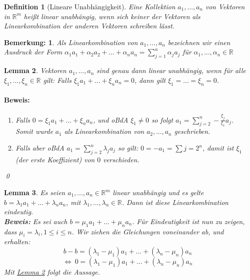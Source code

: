 \documentclass{report}
\newcommand{\IN}[1]{\index{#1|BH}}
\newcommand{\lb}{\lambda}
\newcommand{\R}{\mathbb{R}}
\newcommand{\al}{\alpha}
\theoremstyle{customrem}
\newtheorem*{bemerkung}{Bemerkung\textnormal:}
\theoremstyle{customdef}
\newtheorem{definition}{Definition}[chapter]
\newtheorem{lemma}[definition]{Lemma}
\renewenvironment{proof}{\paragraph{Beweis: }}{\qed}
\begin{document}
	\vspace{.2cm}
	\begin{definition}[Lineare Unabhängigkeit]
		\IN{Lineare Unabhängigkeit}
		\label{deflineareunab}
		Eine Kollektion $a_1, \dots, a_n$ von Vektoren in $\R^m$ heißt linear unabhängig, wenn sich keiner der Vektoren als Linearkombination der anderen Vektoren schreiben lässt.
	\end{definition}
	
	\begin{bemerkung}
		Als Linearkombination von $a_1, \dots, a_n$ bezeichnen  wir einen Ausdruck der Form $\al_1a_1 + \al_2 a_2 + \ldots + \al_n a_n = \sum_{j=1}^n \al_j a_j$ für $\al_1, \dots, \al_n \in \R$
	\end{bemerkung}
	
	\begin{lemma}
		\label{lem10}
		Vektoren $a_1, \dots, a_n$ sind genau dann linear unabhängig, wenn für alle $\xi_1, \dots, \xi_n \in\R$ gilt: Falls $\xi_1a_1 + \dots + \xi_na_n = 0$, dann gilt $\xi_1 = \dots = \xi_n = 0$.\\
		\begin{proof}
			\begin{enumerate}
				\itemsep-.125cm
				\item Falls $0 = \xi_1 a_1 + \dots + \xi_n a_n$, und oBdA $\xi_1 \neq 0$ so folgt $a_1 = \sum_{j=2}^n -\frac{\xi_j}{\xi_1} a_j$. Somit wurde $a_1$ als Linearkombination von $a_2, \dots, a_n$ geschrieben.
				\item Falls aber oBdA $a_1 = \sum_{j=2}^n \lb_j a_j$ so gilt: $0 = -a_1 = \sum{j=2}^n$, damit ist $\xi_1$ (der erste Koeffizient) von $0$ verschieden.
			\end{enumerate}
		\end{proof}
	\end{lemma}
	
	\begin{lemma}
		\label{lem11}
		Es seien $a_1, \dots, a_n \in \R^m$  linear unabhängig und es gelte $b = \lb_1a_1 + \dots + \lb_n a_n$, mit $\lb_1, \dots, \lb_n \in \R$. Dann ist diese Linearkombination eindeutig.\\
		\textbf{Beweis:} Es sei auch $b = \mu_1 a_1 + \dots + \mu_n a_n$. Für Eindeutigkeit ist nun zu zeigen, dass $\mu_i = \lb_i, 1 \le i \le n$.
		Wir ziehen die Gleichungen voneinander ab, und erhalten:
		$$
		b - b= (\lb_1 - \mu_1) a_1 + \ldots + (\lb_n - \mu_n) a_n$$$$
		\iff \ 0 = (\lb_1 - \mu_1) a_1 + \ldots + (\lb_n - \mu_n) a_n
		$$
		Mit \hyperref[lem10]{Lemma \ref*{lem10}} folgt die Aussage.
	\end{lemma}
	
\end{document}
